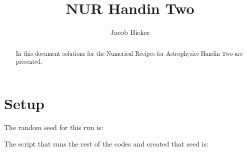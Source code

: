 \documentclass[a4paper,10pt]{article}
\title{NUR Handin Two}
\author{Jacob Bieker}
\begin{document}
\maketitle

\begin{abstract}
 In this document solutions for the Numerical Recipes for Astrophysics Handin Two are presented.
\end{abstract}

\section{Setup}

The random seed for this run is:



The script that runs the rest of the codes and created that seed is:


















\end{document}
